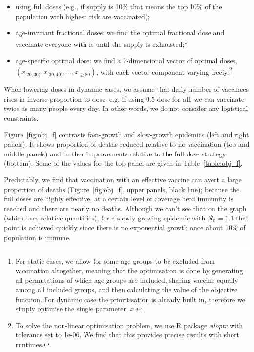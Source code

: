 \documentclass[12pt]{article}
\begin{document}
\begin{itemize}

\item using full doses (e.g., if supply is 10\% that means the top 10\% of the population with highest risk are vaccinated);
\item age-invariant fractional doses: we find the optimal fractional dose and vaccinate everyone with it until the supply is exhausted;\footnote{For static cases, we allow for some age groups to be excluded from vaccination altogether, meaning that the optimisation is done by generating all permutations of which age groups are included, sharing vaccine equally among all included groups, and then calculating the value of the objective function. For dynamic case the prioritisation is already built in, therefore we simply optimise the single parameter, $x$.}
\item age-specific optimal dose: we find a 7-dimensional vector of optimal doses, $(x_{[20,30)}, \allowbreak x_{[30, 40)}, \ldots, x_{\geq 80})$, with each vector component varying freely.\footnote{To solve the non-linear optimisation problem, we use R package \textit{nloptr} with tolerance set to 1e-06. We find that this provides precise results with short runtimes.}

\end{itemize}

When lowering doses in dynamic cases, we assume that daily number of vaccinees rises in inverse proportion to dose: e.g. if using 0.5 dose for all, we can vaccinate twice as many people every day. In other words, we do not consider any logistical constraints.

Figure~\ref{fig:obj_f} contrasts fast-growth and slow-growth epidemics (left and right panels). It shows proportion of deaths reduced relative to no vaccination (top and middle panels) and further improvements relative to the full dose strategy (bottom). Some of the values for the top panel are given in Table~\ref{table:obj_f}. 


\begin{table}
\centering

\caption{Underlying values for parts of Figure~\ref{fig:age_solutions_both}.}
\label{table:obj_f}
\end{table}

Predictably, we find that vaccination with an effective vaccine can avert a large proportion of deaths (Figure~\ref{fig:obj_f}, upper panels, black line); because the full doses are highly effective, at a certain level of coverage herd immunity is reached and there are nearly no deaths. Although we can't see that on the graph (which uses relative quantities), for a slowly growing epidemic with $\mathcal{R}_0 = 1.1$ that point is achieved quickly since there is no exponential growth once about 10\% of population is immune. 
\end{document}
